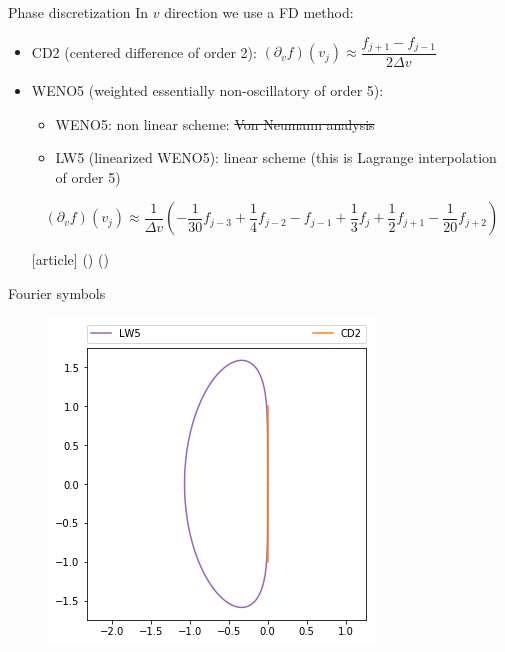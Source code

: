 \documentclass{beamer}
\newcommand{\customcite}[1]{\citeauthor{#1} (\citeyear{#1})}
\begin{document}
\begin{frame}{Phase discretization}
  In $v$ direction we use a FD method:
  \begin{itemize}
    \item CD2 (centered difference of order 2): $(\partial_v f)(v_j)\approx \dfrac{f_{j+1}-f_{j-1}}{2\Delta v}$
    \item WENO5 (weighted essentially non-oscillatory of order 5):
      \begin{itemize}
        \item WENO5: non linear scheme: \st{Von Neumann analysis}
        \item LW5 (linearized WENO5): linear scheme (this is Lagrange interpolation of order 5)
      \end{itemize}
      $$
        (\partial_vf)(v_j)\approx\frac{1}{\Delta v}\left(-\frac{1}{30}f_{j-3} + \frac{1}{4}f_{j-2} - f_{j-1} + \frac{1}{3}f_j + \frac{1}{2}f_{j+1} - \frac{1}{20}f_{j+2}\right)
      $$

\begin{thebibliography}{9}
  [article]
   \customcite{Wang:2007}
   \customcite{Motamed:2010}
\end{thebibliography}

  \end{itemize}
\end{frame}
\begin{frame}{Fourier symbols}
  \begin{figure}\centering
    \includegraphics[height=0.8\textheight]{img/weno.png}
  \end{figure}
\end{frame}
\end{document}
